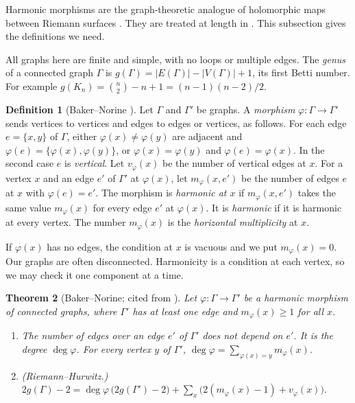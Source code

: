 \documentclass[12pt,letterpaper]{article}
\numberwithin{equation}{section}
\theoremstyle{plain}
\newtheorem{theorem}{Theorem}[section]
\theoremstyle{definition}
\newtheorem{definition}[theorem]{Definition}
\begin{document}
Harmonic morphisms are the graph-theoretic analogue of holomorphic maps
between Riemann surfaces \cite{BN09,Ur00}. They are treated at length in
\cite{MJ26}. This subsection gives the definitions we need.

All graphs here are finite and simple, with no loops or multiple edges. The
\emph{genus} of a connected graph $\Gamma$ is $g(\Gamma)=|E(\Gamma)|-
|V(\Gamma)|+1$, its first Betti number. For example
$g(K_n)=\binom n2-n+1=(n-1)(n-2)/2$.

\begin{definition}[Baker--Norine \cite{BN09}]\label{def:harmonic}
Let $\Gamma$ and $\Gamma'$ be graphs. A \emph{morphism}
$\varphi\colon\Gamma\to\Gamma'$ sends vertices to vertices and edges to
edges or vertices, as follows. For each edge $e=\{x,y\}$ of $\Gamma$,
either $\varphi(x)\neq\varphi(y)$ are adjacent and
$\varphi(e)=\{\varphi(x),\varphi(y)\}$, or $\varphi(x)=\varphi(y)$ and
$\varphi(e)=\varphi(x)$. In the second case $e$ is \emph{vertical}. Let
$v_\varphi(x)$ be the number of vertical edges at $x$. For a vertex $x$ and
an edge $e'$ of $\Gamma'$ at $\varphi(x)$, let $m_\varphi(x,e')$ be the
number of edges $e$ at $x$ with $\varphi(e)=e'$. The morphism is
\emph{harmonic at $x$} if $m_\varphi(x,e')$ takes the same value
$m_\varphi(x)$ for every edge $e'$ at $\varphi(x)$. It is \emph{harmonic}
if it is harmonic at every vertex. The number $m_\varphi(x)$ is the
\emph{horizontal multiplicity} at $x$.
\end{definition}

If $\varphi(x)$ has no edges, the condition at $x$ is vacuous and we put
$m_\varphi(x)=0$. Our graphs are often disconnected. Harmonicity is a
condition at each vertex, so we may check it one component at a time.

\begin{theorem}[Baker--Norine; cited from {\cite[\S2]{BN09}}]
\label{thm:bn}
Let $\varphi\colon\Gamma\to\Gamma'$ be a harmonic morphism of connected
graphs, where $\Gamma'$ has at least one edge and $m_\varphi(x)\ge1$ for
all $x$.
\begin{enumerate}[label=(\alph*),itemsep=1pt]
\item The number of edges over an edge $e'$ of $\Gamma'$ does not depend on
  $e'$. It is the \emph{degree} $\deg\varphi$. For every vertex $y$ of
  $\Gamma'$, $\deg\varphi=\sum_{\varphi(x)=y}m_\varphi(x)$.
\item (Riemann--Hurwitz.) $2g(\Gamma)-2=\deg\varphi\,\bigl(2g(\Gamma')-2
  \bigr)+\sum_{x}\bigl(2(m_\varphi(x)-1)+v_\varphi(x)\bigr)$.
\end{enumerate}
\end{theorem}
\end{document}
